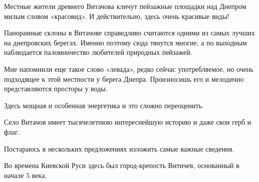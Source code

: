 \raggedcolumns
\begin{multicols}{3} %
\setlength{\parindent}{0pt}








\end{multicols} %

Местные жители древнего Витачова кличут пейзажные площадки над Днепром милым
словом «красовид». И действительно, здесь очень красивые виды!

Панорамные склоны в Витачове справедливо считаются одними из самых лучших на
днепровских берегах. Именно поэтому сюда тянутся многие, а по выходным
наблюдается паломничество любителей природных пейзажей. 


Мне напомнили еще такое слово «левада», редко сейчас употребляемое, но очень
подходящее к этой местности у берега Днепра. Произносишь его и мелодично
представляются просторы у воды. 

Здесь мощная и особенная  энергетика и это  сложно переоценить. 

Село Витачов имеет тысячелетнюю интереснейшую историю и даже свои герб и флаг.

Постараюсь в нескольких предложениях изложить самые важные сведения.

Во времена Киевской Руси здесь был город-крепость Витичев, основанный в начале
5 века. 

\raggedcolumns
\begin{multicols}{3} %
\setlength{\parindent}{0pt}



\end{multicols} %

